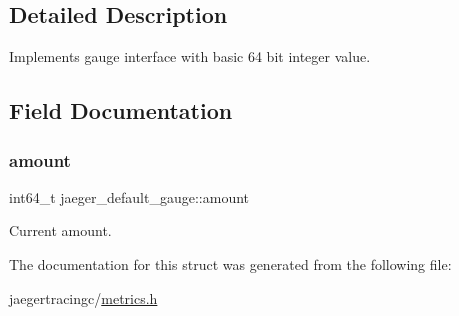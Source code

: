 \subsection{Detailed Description}
Implements gauge interface with basic 64 bit integer value. 

\subsection{Field Documentation}
\mbox{\label{structjaeger__default__gauge_a5b5def7f03d492758487c564d9e0e6e3}} 
\subsubsection{\texorpdfstring{amount}{amount}}
{\footnotesize\ttfamily int64\+\_\+t jaeger\+\_\+default\+\_\+gauge\+::amount}



Current amount. 



The documentation for this struct was generated from the following file\+:\begin{DoxyCompactItemize}
\item 
jaegertracingc/\mbox{\hyperlink{metrics_8h}{metrics.\+h}}\end{DoxyCompactItemize}
